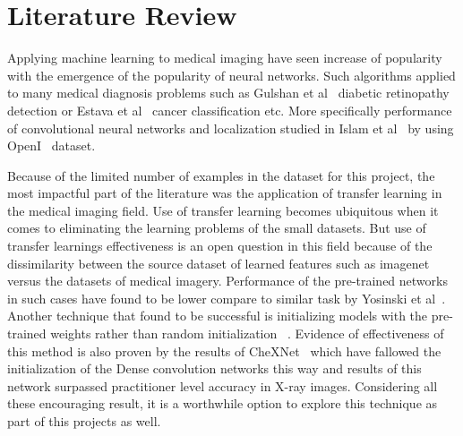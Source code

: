 \section{Literature Review}

Applying machine learning to medical imaging have seen increase of popularity with the emergence of the popularity of neural networks.
Such algorithms applied to many medical diagnosis problems such as Gulshan et al~\cite{retinopathy} diabetic retinopathy detection or Estava et al~\cite{skincancer} cancer classification etc.
More specifically performance of convolutional neural networks and localization studied in Islam et al~\cite{abnormalxray} by using OpenI~\cite{openi} dataset.

Because of the limited number of examples in the dataset for this project, the most impactful part of the literature was the application of transfer learning in the medical imaging field.
Use of transfer learning becomes ubiquitous when it comes to eliminating the learning problems of the small datasets.
But use of transfer learnings effectiveness is an open question in this field because of the dissimilarity between the source dataset of learned features such as imagenet versus the datasets of medical imagery. 
Performance of the pre-trained networks in such cases have found to be lower compare to similar task by Yosinski et al~\cite{transferfeatures}.
Another technique that found to be successful is initializing models with the pre-trained weights rather than random initialization ~\cite{transfusion,bettertransfer, RethinkingIP}.
Evidence of effectiveness of this method is also proven by the results of CheXNet~\cite{CheXNetRP} which have fallowed the initialization of the Dense convolution networks this way and results of this network surpassed practitioner level accuracy in X-ray images.
Considering all these encouraging result, it is a worthwhile option to explore this technique as part of this projects as well.



\clearpage